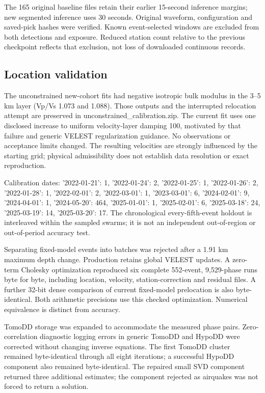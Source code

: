 The 165 original baseline files retain their earlier 15-second inference margins; new segmented inference uses 30 seconds. Original waveform, configuration and saved-pick hashes were verified. Known event-selected windows are excluded from both detections and exposure. Reduced station count relative to the previous checkpoint reflects that exclusion, not loss of downloaded continuous records.

\subsection*{Location validation}

The unconstrained new-cohort fits had negative isotropic bulk modulus in the 3--5 km layer (Vp/Vs 1.073 and 1.088). Those outputs and the interrupted relocation attempt are preserved in unconstrained\_calibration.zip. The current fit uses one disclosed increase to uniform velocity-layer damping 100, motivated by that failure and generic VELEST regularization guidance. No observations or acceptance limits changed. The resulting velocities are strongly influenced by the starting grid; physical admissibility does not establish data resolution or exact reproduction.

Calibration dates: {'2022-01-21': 1, '2022-01-24': 2, '2022-01-25': 1, '2022-01-26': 2, '2022-01-28': 1, '2022-02-01': 2, '2022-03-01': 1, '2023-03-01': 6, '2024-02-01': 9, '2024-04-01': 1, '2024-05-20': 464, '2025-01-01': 1, '2025-02-01': 6, '2025-03-18': 24, '2025-03-19': 14, '2025-03-20': 17}. The chronological every-fifth-event holdout is interleaved within the sampled swarms; it is not an independent out-of-region or out-of-period accuracy test.

Separating fixed-model events into batches was rejected after a 1.91 km maximum depth change. Production retains global VELEST updates. A zero-term Cholesky optimization reproduced six complete 552-event, 9,529-phase runs byte for byte, including location, velocity, station-correction and residual files. A further 32-bit dense comparison of current fixed-model prelocation is also byte-identical. Both arithmetic precisions use this checked optimization. Numerical equivalence is distinct from accuracy.

TomoDD storage was expanded to accommodate the measured phase pairs. Zero-correlation diagnostic logging errors in generic TomoDD and HypoDD were corrected without changing inverse equations. The first TomoDD cluster remained byte-identical through all eight iterations; a successful HypoDD component also remained byte-identical. The repaired small SVD component returned three additional estimates; the component rejected as airquakes was not forced to return a solution.

